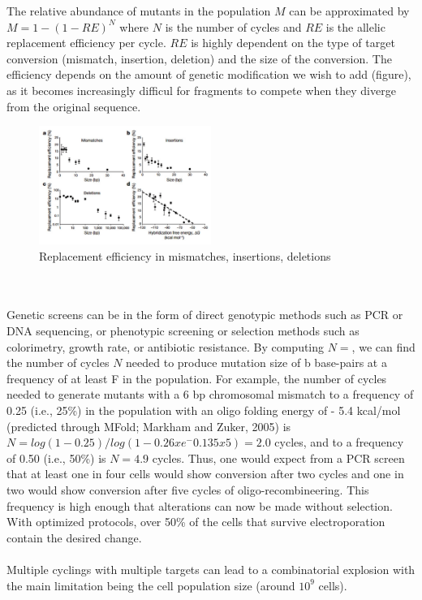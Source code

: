 \noindent
The relative abundance of mutants in the population $M$ can be approximated by $M=1-(1-RE)^N$ where $N$ is the number of cycles and $RE$ is the allelic replacement efficiency per cycle. 
$RE$ is highly dependent on the type of target conversion (mismatch, insertion, deletion) and the size of the conversion. 
The efficiency depends on the amount of genetic modification we wish to add (figure), as it becomes increasingly difficul for fragments to compete when they diverge from the original sequence.
\begin{figure}
\includegraphics[width=0.5\textwidth, center ]{rep_eff}
\caption{\label{fig:pure} Replacement efficiency in mismatches, insertions, deletions}
\end{figure}
\\
\\
\noindent
Genetic screens can be in the form of direct genotypic methods such as PCR or DNA sequencing, or phenotypic screening or selection methods such as colorimetry, growth rate, or antibiotic resistance. 
By computing $N=$, we can find the number of cycles $N$ needed to produce mutation size of b base-pairs at a frequency of at least F in the population.
For example, the number of cycles needed to generate mutants with a 6 bp chromosomal mismatch to a frequency of 0.25 (i.e., 25\%) in the population with an oligo folding energy of - 5.4 kcal/mol (predicted through MFold; Markham and Zuker, 2005) is $N=log(1-0.25)/log(1-0.26x e^-0.135 x 5)=2.0$ cycles, and to a frequency of 0.50 (i.e., 50\%) is $N = 4.9$ cycles. 
Thus, one would expect from a PCR screen that at least one in four cells would show conversion after two cycles and one in two would show conversion after five cycles of oligo-recombineering. 
This frequency is high enough that alterations can now be made without selection. With optimized protocols, over 50\% of the cells that survive electroporation contain the desired change. 
\\
\\
\noindent
Multiple cyclings with multiple targets can lead to a combinatorial explosion with the main limitation being the cell population size (around $10^9$ cells). 
